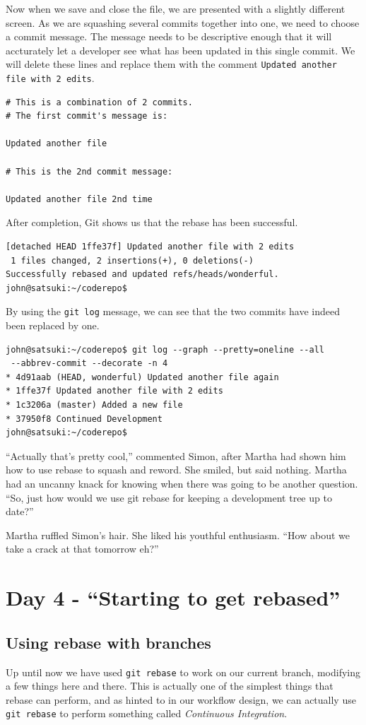 Now when we save and close the file, we are presented with a slightly different screen.  As we are squashing several commits together into one, we need to choose a commit message.  The message needs to be descriptive enough that it will accturately let a developer see what has been updated in this single commit.  We will delete these lines and replace them with the comment \texttt{Updated another file with 2 edits}.

\begin{Verbatim}
# This is a combination of 2 commits.
# The first commit's message is:

Updated another file

# This is the 2nd commit message:

Updated another file 2nd time
\end{Verbatim}

After completion, Git shows us that the rebase has been successful.

\begin{Verbatim}
[detached HEAD 1ffe37f] Updated another file with 2 edits
 1 files changed, 2 insertions(+), 0 deletions(-)
Successfully rebased and updated refs/heads/wonderful.
john@satsuki:~/coderepo$ 
\end{Verbatim}

By using the \texttt{git log} message, we can see that the two commits have indeed been replaced by one.

\begin{Verbatim}
john@satsuki:~/coderepo$ git log --graph --pretty=oneline --all 
 --abbrev-commit --decorate -n 4
* 4d91aab (HEAD, wonderful) Updated another file again
* 1ffe37f Updated another file with 2 edits
* 1c3206a (master) Added a new file
* 37950f8 Continued Development
john@satsuki:~/coderepo$ 
\end{Verbatim}

\begin{trenches}
``Actually that's pretty cool,'' commented Simon, after Martha had shown him how to use rebase to squash and reword.  She smiled, but said nothing.  Martha had an uncanny knack for knowing when there was going to be another question.  ``So, just how would we use git rebase for keeping a development tree up to date?''

Martha ruffled Simon's hair.  She liked his youthful enthusiasm.  ``How about we take a crack at that tomorrow eh?''
\end{trenches}

\section{Day 4 - ``Starting to get rebased''}
\subsection{Using rebase with branches}

Up until now we have used \texttt{git rebase} to work on our current branch, modifying a few things here and there.  This is actually one of the simplest things that rebase can perform, and as hinted to in our workflow design, we can actually use \texttt{git rebase} to perform something called \emph{Continuous Integration}.
